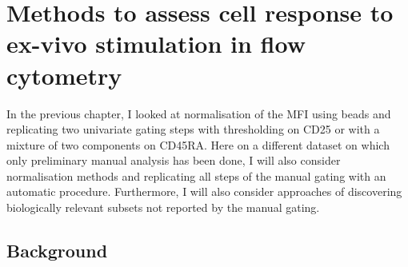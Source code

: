 \chapter{ \label{chapter:il2} Methods to assess cell response to ex-vivo stimulation in flow cytometry }

In the previous chapter, I looked at normalisation of the MFI using beads and replicating two univariate gating steps with thresholding on CD25
or with a mixture of two components on CD45RA.
Here on a different dataset on which only preliminary manual analysis has been done, I will also consider normalisation methods and replicating all steps of the manual gating
with an automatic procedure.
Furthermore, I will also consider approaches of discovering biologically relevant subsets not reported by the manual gating.

\section{Background}

